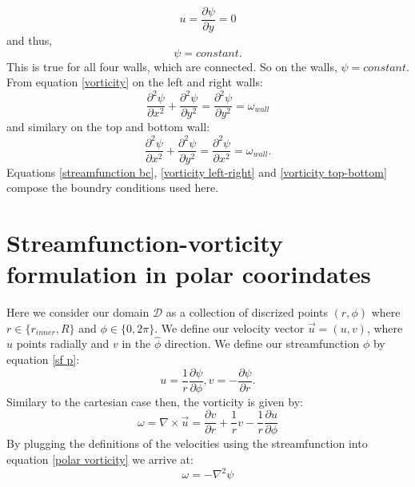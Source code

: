 \documentclass{article}
\begin{document}
\begin{equation}
	u = \frac{\partial \psi}{\partial y} = 0
\end{equation}
and thus,
\begin{equation}
	\psi = constant.
	\label{streamfunction bc}
\end{equation}
This is true for all four walls, which are connected. So on the walls, $\psi = constant$.
From equation \ref{vorticity} on the left and right walls:
\begin{equation}
	\frac{\partial^2 \psi}{\partial x^2} + \frac{\partial^2 \psi}{\partial y^2} = \frac{\partial^2 \psi}{\partial y^2}= \omega_{wall}
	\label{vorticity left-right}
\end{equation}
and similary on the top and bottom wall:
\begin{equation}
	\frac{\partial^2 \psi}{\partial x^2} + \frac{\partial^2 \psi}{\partial y^2} = \frac{\partial^2 \psi}{\partial x^2}= \omega_{wall}.
	\label{vorticity top-bottom}
\end{equation}
Equations \ref{streamfunction bc}, \ref{vorticity left-right} and \ref{vorticity top-bottom} compose the boundry conditions used here.


\section*{Streamfunction-vorticity formulation in polar coorindates}
Here we consider our domain $\mathcal{D}$ as a collection of discrized points $(r, \phi)$ where $r\in \{ r_{inner}, R\}$ and $\phi \in \{ 0, 2 \pi\}$. We define our velocity vector $\vec{u} = (u,v)$, where $u$ points radially and $v$ in the $\hat{\phi}$ direction. We define our streamfunction $\phi$ by equation \ref{sf p}:
\begin{equation}
	u = \frac{1}{r} \frac{\partial \psi}{\partial \phi}, v = - \frac{\partial \psi}{\partial r}.
	\label{sf p}
\end{equation}
Similary to the cartesian case then, the vorticity is given by:
\begin{equation}
	\omega = \nabla \times \vec{u} = \frac{\partial v}{\partial r} + \frac{1}{r} v - \frac{1}{r} \frac{\partial u}{\partial \phi}
	\label{polar vorticity}
\end{equation}
By plugging the definitions of the velocities using the streamfunction into equation \ref{polar vorticity} we arrive at:
\begin{equation}
	\omega = - \nabla^2 \psi
	\label{polar vort-stream}
\end{equation}
\end{document}
